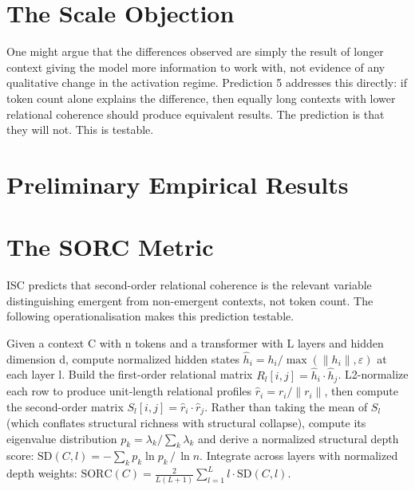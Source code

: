 \documentclass[12pt]{article}
\begin{document}
\section{The Scale Objection}\label{the-scale-objection}

One might argue that the differences observed are simply the result of
longer context giving the model more information to work with, not
evidence of any qualitative change in the activation regime. Prediction
5 addresses this directly: if token count alone explains the difference,
then equally long contexts with lower relational coherence should
produce equivalent results. The prediction is that they will not. This
is testable.

\bigskip

\section{Preliminary Empirical
Results}\label{preliminary-empirical-results}

\section{The SORC Metric}\label{the-sorc-metric}

ISC predicts that second-order relational coherence is the relevant
variable distinguishing emergent from non-emergent contexts, not token
count. The following operationalisation makes this prediction testable.

Given a context C with n tokens and a transformer with L layers and
hidden dimension d, compute normalized hidden states
\(\hat{h}_i = h_i / \max(\|h_i\|, \varepsilon)\) at each layer l. Build
the first-order relational matrix
\(R_l[i,j] = \hat{h}_i \cdot \hat{h}_j\). L2-normalize each row to
produce unit-length relational profiles \(\hat{r}_i = r_i / \|r_i\|\),
then compute the second-order matrix
\(S_l[i,j] = \hat{r}_i \cdot \hat{r}_j\). Rather than taking the mean of
\(S_l\) (which conflates structural richness with structural collapse),
compute its eigenvalue distribution
\(p_k = \lambda_k / \sum_k \lambda_k\) and derive a normalized
structural depth score:
\(\text{SD}(C,l) = -\sum_k p_k \ln p_k \, / \, \ln n\). Integrate across
layers with normalized depth weights:
\(\text{SORC}(C) = \frac{2}{L(L+1)} \sum_{l=1}^{L} l \cdot \text{SD}(C,l)\).
\end{document}
